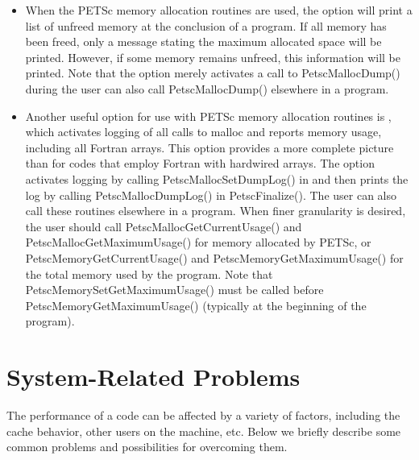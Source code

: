 {{\begin{itemize}
\item When the PETSc memory allocation routines are used, the option 
 will print a list of unfreed memory at the conclusion of a
program.  If all memory has been freed, only a message stating
the maximum allocated space will be printed.  However, if some memory
remains unfreed, this information will be printed.  Note that the
option  merely activates a call to PetscMallocDump() during
 the user can also call PetscMallocDump() elsewhere
in a program.

\item Another useful option for use with PETSc memory allocation
routines is , which activates logging of all calls
to malloc and reports memory usage, including all Fortran arrays.
This option provides a more complete picture than  for
codes that employ Fortran with hardwired arrays.  The option
 activates logging by calling PetscMallocSetDumpLog() in
 and then prints the log by calling PetscMallocDumpLog()
in PetscFinalize().  The user can also call these routines elsewhere in a
program.  When finer granularity is desired, the user should call
PetscMallocGetCurrentUsage() and PetscMallocGetMaximumUsage() for memory
allocated by PETSc, or PetscMemoryGetCurrentUsage() and
PetscMemoryGetMaximumUsage() for the total memory used by the program.
Note that PetscMemorySetGetMaximumUsage() must be called before
PetscMemoryGetMaximumUsage() (typically at the beginning of the program).

\end{itemize}

%
%
\section{System-Related Problems}

The performance of a code can be affected by a variety of factors, 
including the cache behavior, other users on the machine, etc.
Below we briefly describe some common problems and possibilities for
overcoming them.

}}
